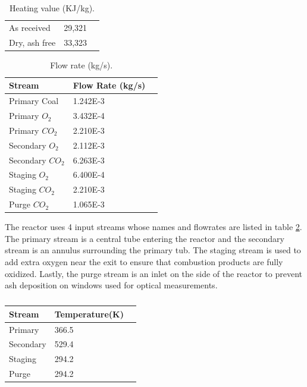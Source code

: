 \documentclass[review,3p]{elsarticle}
\begin{document}
\begin{table}[!h]
	\caption{Heating value (KJ/kg).}
	\label{t:heat}
	\centering
	\begin{tabular}{l l l}
	\hline
	
	As received & 29,321 \\ 
    Dry, ash free & 33,323 \\ 
\hline
\end{tabular}
\end{table}


\begin{table}[!h]
	\caption{Flow rate (kg/s).}
	\label{t:flowrates}
	\centering
	\begin{tabular}{l l l}
	\hline
	Stream & Flow Rate (kg/s)  \\ \hline
	Primary Coal & 1.242E-3  \\ 
    Primary $O_2$ & 3.432E-4\\ 
    Primary $CO_2$ & 2.210E-3  \\ 
    
    Secondary $O_2$ & 2.112E-3 \\ 
    Secondary $CO_2$ & 6.263E-3  \\ 
    Staging $O_2$ & 6.400E-4\\ 
    Staging $CO_2$ & 2.210E-3  \\
    Purge $CO_2$  & 1.065E-3  \\ 
	
\hline
\end{tabular}
\end{table}

The reactor uses 4 input streams whose names and flowrates are listed in table \ref{t:flowrates}.  The primary stream is a central tube entering the reactor and the secondary stream is an annulus surrounding the primary tub.  The staging stream is used to add extra oxygen near the exit to ensure that combustion products are fully oxidized.  Lastly, the purge stream is an inlet on the side of the reactor to prevent ash deposition on windows used for optical measurements.  

\begin{table}[!h]
	\caption{}
	\label{t:stream_temperatures}
	\centering
	\begin{tabular}{l l l}
	\hline
	Stream & Temperature(K) \\ \hline
    Primary & 366.5 \\ 
    Secondary & 529.4  \\ 
    Staging  & 294.2 \\ 
    Purge  & 294.2 \\ 
	
\hline
\end{tabular}
\end{table}
\end{document}
